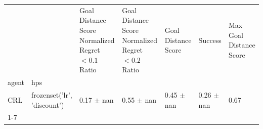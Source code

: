 \begin{tabular}{lllllll}
\toprule
 &  & Goal Distance Score Normalized Regret $< 0.1$ Ratio & Goal Distance Score Normalized Regret $< 0.2$ Ratio & Goal Distance Score & Success & Max Goal Distance Score \\
agent & hps &  &  &  &  &  \\
\midrule
CRL & frozenset({'lr', 'discount'}) & 0.17 $\pm$ nan & 0.55 $\pm$ nan & 0.45 $\pm$ nan & 0.26 $\pm$ nan & 0.67 \\
\cline{1-7}
\bottomrule
\end{tabular}
